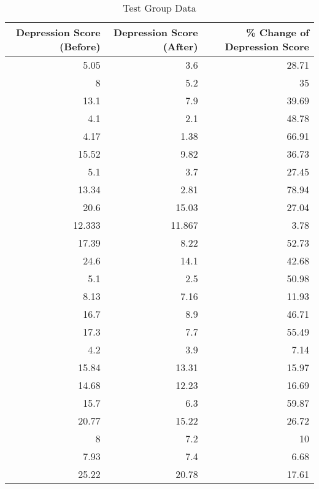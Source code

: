 \documentclass[12pt]{article}
\begin{document}
 \begin{table}[hbt!]
    \small
    \caption{Test Group Data}
    \label{tab:1}
    \centering
  \begin{tabular}{rrr}
      \toprule
  Depression Score (Before) & Depression Score (After) & \% Change of Depression Score \\ 
    \midrule
     5.05 & 3.6 & 28.71\\ 
     8 & 5.2 & 35\\ 
     13.1 & 7.9 & 39.69\\ 
     4.1 & 2.1 & 48.78\\ 
     4.17 & 1.38 & 66.91\\ 
     15.52 & 9.82 & 36.73\\  
     5.1 & 3.7 & 27.45\\
     13.34 & 2.81 & 78.94\\
     20.6 & 15.03 & 27.04\\
     12.333 & 11.867 & 3.78\\
     17.39 & 8.22 & 52.73\\
     24.6 & 14.1 & 42.68\\
     5.1 & 2.5 & 50.98\\
     8.13 & 7.16 & 11.93\\
     16.7 & 8.9 & 46.71\\
     17.3 & 7.7 & 55.49\\
     4.2 & 3.9 & 7.14\\
     15.84 & 13.31 & 15.97\\
     14.68 & 12.23 & 16.69\\
     15.7 & 6.3 & 59.87\\
     20.77 & 15.22 & 26.72\\
     8 & 7.2 & 10\\
     7.93 & 7.4 & 6.68\\
     25.22 & 20.78 & 17.61\\
     \bottomrule
  \end{tabular}
  \end{table}
  
  \newpage
  
\end{document}
